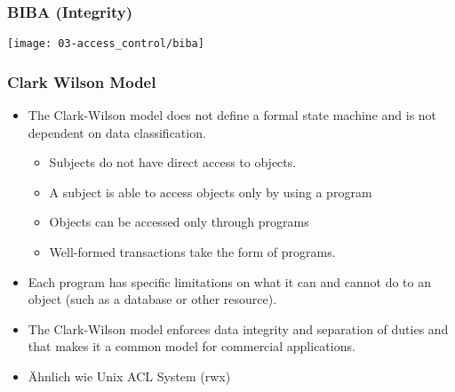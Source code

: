\subsubsection{BIBA (Integrity)}
\texttt{[image: 03-access\_control/biba]}

\subsubsection{Clark Wilson Model}
\begin{itemize}
    \item The Clark-Wilson model does not define a formal state machine and is not dependent on data classification.
    \begin{itemize}
        \item Subjects do not have direct access to objects.
        \item A subject is able to access objects only by using a program
        \item Objects can be accessed only through programs
        \item Well-formed transactions take the form of programs.
    \end{itemize}
    \item Each program has specific limitations on what it can and cannot do to an object (such as a database or other resource).
    \item The Clark-Wilson model enforces data integrity and separation of duties and that makes it a common model for commercial applications.
    \item Ähnlich wie Unix ACL System (rwx)
\end{itemize}

